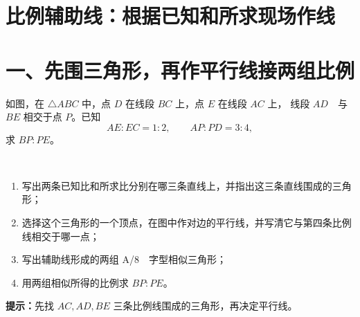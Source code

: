 \documentclass{exam-zh}
\begin{document}
\section*{比例辅助线：根据已知和所求现场作线}

\section*{一、先围三角形，再作平行线接两组比例}


\begin{problem}[points=10]
  \noindent
  \begin{minipage}[t]{\dimexpr\linewidth-60mm-6mm\relax}
    \vspace{0pt}
    如图，在 $\triangle ABC$ 中，点 $D$ 在线段 $BC$ 上，点 $E$ 在线段 $AC$ 上，
线段 $AD$\ \ 与 $BE$ 相交于点 $P$。已知
\[
AE:EC=1:2,\qquad AP:PD=3:4,
\]
求 $BP:PE$。

\ \begin{enumerate}[label=(\arabic*)]
  \item 写出两条已知比和所求比分别在哪三条直线上，并指出这三条直线围成的三角形；
\ \  \item 选择这个三角形的一个顶点，在图中作对边的平行线，并写清它与第四条比例线相交于哪一点；
  \item 写出辅助线形成的两组 A/8\ \ 字型相似三角形；
  \item 用两组相似所得的比例求 $BP:PE$。
\end{enumerate}

    \begin{hintbox}
\textbf{提示：}先找 $AC,AD,BE$ 三条比例线围成的三角形，再决定平行线。\end{hintbox}


\end{minipage}
\end{problem}
\end{document}
